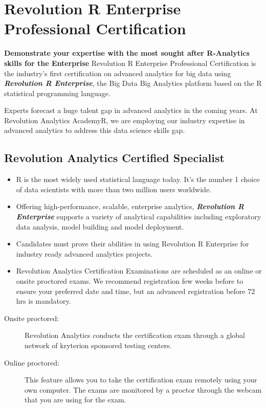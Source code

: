 \documentclass[]{article}
\begin{document}
	
	
	\Large

\section*{Revolution R Enterprise Professional Certification}

\textbf{Demonstrate your expertise with the most sought after R-Analytics skills for the Enterprise}
\bigskip
\noindent Revolution R Enterprise Professional Certification is the industry’s first certification on advanced analytics for big data using \textbf{\textit{Revolution R Enterprise}}, the Big Data Big Analytics platform based on the R statistical programming language. 

Experts forecast a huge talent gap in advanced analytics in the coming years. At Revolution Analytics AcademyR, we are employing our industry expertise in advanced analytics to address this data science skills gap.
\newpage

\subsection*{Revolution Analytics Certified Specialist}
\begin{itemize}
\item R\texttt{} is the most widely used statistical language today. It’s the number 1 choice of data scientists with more than two million users worldwide. 
\item Offering high-performance, scalable, enterprise analytics, \textbf{\textit{Revolution R Enterprise}} supports a variety of analytical capabilities including exploratory data analysis, model building and model deployment.

\item  Candidates must prove their abilities in using Revolution R Enterprise for industry ready advanced analytics projects. 

\item  Revolution Analytics Certification Examinations are scheduled as an online or onsite proctored exams. We recommend registration few weeks before to ensure your preferred date and time, but an advanced registration before 72 hrs is mandatory.
\end{itemize}
\bigskip
\begin{description}
\item[Onsite proctored:] Revolution Analytics conducts the certification exam through a global network of kryterion sponsored testing centers.
\item[Online proctored:] This feature allows you to take the certification exam remotely using your own computer.  The exams are monitored by a proctor through the webcam that you are using for the exam.
\end{description}
\newpage
\end{document}
